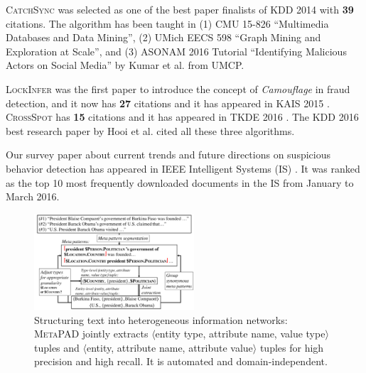 \documentclass[10.5pt]{article}
\newcommand{\lb}{\mbox{$\langle$}}
\newcommand{\rb}{\mbox{$\rangle$}}
\newcommand{\tuple}[3]{{\lb#1, #2, #3\rb}\xspace}
\begin{document}
\begin{compactitem}
\item \textsc{CatchSync} \cite{jiang2014catchsync} was selected as one of the best paper finalists of KDD 2014 with \textbf{39} citations. The algorithm has been taught in (1) CMU 15-826 ``Multimedia Databases and Data Mining'', (2) UMich EECS 598 ``Graph Mining and Exploration at Scale'', and (3) ASONAM 2016 Tutorial ``Identifying Malicious Actors on Social Media'' by Kumar et al. from UMCP.
\item \textsc{LockInfer} \cite{jiang2014inferring} was the first paper to introduce the concept of \textit{Camouflage} in fraud detection, and it now has \textbf{27} citations and it has appeared in KAIS 2015 \cite{jiang2015inferring}. \textsc{CrossSpot} \cite{jiang2015general} has \textbf{15} citations and it has appeared in TKDE 2016 \cite{jiang2016spotting}. The KDD 2016 best research paper by Hooi et al. cited all these three algorithms.
\item Our survey paper about current trends and future directions on suspicious behavior detection has appeared in IEEE Intelligent Systems (IS) \cite{jiang2016suspicious}. It was ranked as the top 10 most frequently downloaded documents in the IS from January to March 2016.
\end{compactitem}

\vskip 0.05in
\vskip 0.01in


\begin{figure}
\vskip -0.18in
\includegraphics[width=0.53\textwidth]{figure/metapad.pdf}
\vskip -0.18in
\caption{Structuring text into heterogeneous information networks: \textsc{MetaPAD} jointly extracts \tuple{entity type}{attribute name}{value type} tuples and \tuple{entity}{attribute name}{attribute value} tuples for high precision and high recall. It is automated and domain-independent.}
\label{fig:metapad}
\vskip -0.12in
\end{figure}
\end{document}
